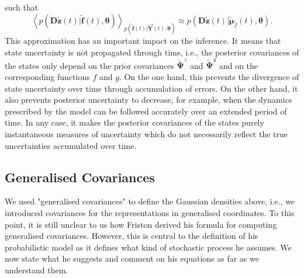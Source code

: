\documentclass[a4paper,10pt]{article}
\newcommand{\bs}[1]{\mathbf{#1}}					%
\newcommand{\bgs}[1]{\boldsymbol{#1}}				%
\newcommand{\eq}[1]{\begin{equation} #1 \end{equation}}%
\newcommand{\gc}[1]{\tilde{#1}} %
\renewcommand{\ss}{z}         %
\newcommand{\so}{y}         %
\renewcommand{\sp}{\theta}    %
\newcommand{\ps}{\bs{\ss}}    %
\newcommand{\psg}{\gc{\ps}}    %
\newcommand{\pp}{\bgs{\sp}} %
\newcommand{\Po}{\bs{Y}}    %
\newcommand{\D}{\bs{D}}				%
\newcommand{\E}[2][]{\left\langle #2 \right\rangle_{#1}}	%
\begin{document}
such that
\eq{
    \E[p(\gc{\bs{f}}(t)|\vec{\Po}(t),\pp)]{p(\D\psg(t)|\gc{\bs{f}}(t),\pp)} \approx p(\D\psg(t)|\gc{\bgs{\mu}}_{\gc{f}}(t),\pp).
}
This approximation has an important impact on the inference. It means that state uncertainty is not propagated through time, i.e., the posterior covariances of the states only depend on the prior covariances $\gc{\bgs{\Psi}}^\ss$ and $\gc{\bgs{\Psi}}^\so$ and on the corresponding functions $f$ and $g$. On the one hand, this prevents the divergence of state uncertainty over time through accumulation of errors. On the other hand, it also prevents posterior uncertainty to decrease, for example, when the dynamics prescribed by the model can be followed accurately over an extended period of time. In any case, it makes the posterior covariances of the states purely instantaneous measures of uncertainty which do not necessarily reflect the true uncertainties accumulated over time.


\subsection{Generalised Covariances}
We used "generalised covariances" to define the Gaussian densities above, i.e., we introduced covariances for the representations in generalised coordinates. To this point, it is still unclear to us how Friston derived his formula for computing generalised covariances. However, this is central to the definition of his probabilistic model as it defines what kind of stochastic process he assumes. We now state what he suggests and comment on his equations as far as we understand them. 
\end{document}
